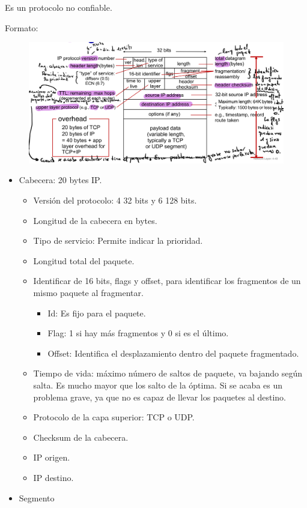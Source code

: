 \documentclass[12pt, twoside, openright]{report} %
\begin{document}
    Es un protocolo no confiable.

	Formato:
	\begin{figure}[H]
		{\includegraphics[scale=.17]{Untitled 28.png}}
	\end{figure}
    \begin{itemize}
    \item
      Cabecera: 20 bytes IP.

      \begin{itemize}
      \item
        Versión del protocolo: 4 32 bits y 6 128 bits.
      \item
        Longitud de la cabecera en bytes.
      \item
        Tipo de servicio: Permite indicar la prioridad.
      \item
        Longitud total del paquete.
      \item
        Identificar de 16 bits, flags y offset, para identificar los
        fragmentos de un mismo paquete al fragmentar.

        \begin{itemize}
        \item
          Id: Es fijo para el paquete.
        \item
          Flag: 1 si hay más fragmentos y 0 si es el último.
        \item
          Offset: Identifica el desplazamiento dentro del paquete
          fragmentado.
        \end{itemize}
      \item
        Tiempo de vida: máximo número de saltos de paquete, va bajando
        según salta. Es mucho mayor que los salto de la óptima. Si se
        acaba es un problema grave, ya que no es capaz de llevar los
        paquetes al destino.
      \item
        Protocolo de la capa superior: TCP o UDP.
      \item
        Checksum de la cabecera.
      \item
        IP origen.
      \item
        IP destino.
      \end{itemize}
    \item
      Segmento
    \end{itemize}
\end{document}
